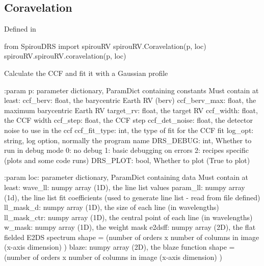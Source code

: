 \noindent\begin{minipage}{\textwidth}
\subsection{Coravelation}

Defined in \spirouRV{}

\begin{pythonbox}
from SpirouDRS import spirouRV
spirouRV.Coravelation(p, loc)
spirouRV.spirouRV.coravelation(p, loc)
\end{pythonbox}

\begin{pythondocstring}
Calculate the CCF and fit it with a Gaussian profile

:param p: parameter dictionary, ParamDict containing constants
    Must contain at least:
            ccf_berv: float, the barycentric Earth RV (berv)
            ccf_berv_max: float, the maximum barycentric Earth RV
            target_rv: float, the target RV
            ccf_width: float, the CCF width
            ccf_step: float, the CCF step
            ccf_det_noise: float, the detector noise to use in the ccf
            ccf_fit_type: int, the type of fit for the CCF fit
            log_opt: string, log option, normally the program name
            DRS_DEBUG: int, Whether to run in debug mode
                            0: no debug
                            1: basic debugging on errors
                            2: recipes specific (plots and some code runs)
            DRS_PLOT: bool, Whether to plot (True to plot)

:param loc: parameter dictionary, ParamDict containing data
        Must contain at least:
            wave_ll: numpy array (1D), the line list values
            param_ll: numpy array (1d), the line list fit coefficients
                      (used to generate line list - read from file defined)
            ll_mask_d: numpy array (1D), the size of each line
                       (in wavelengths)
            ll_mask_ctr: numpy array (1D), the central point of each line
                         (in wavelengths)
            w_mask: numpy array (1D), the weight mask
            e2dsff: numpy array (2D), the flat fielded E2DS spectrum
                    shape = (number of orders x number of columns in image
                                                  (x-axis dimension) )
            blaze: numpy array (2D), the blaze function
                    shape = (number of orders x number of columns in image
                                                  (x-axis dimension) )


\end{pythondocstring}
\end{minipage}
